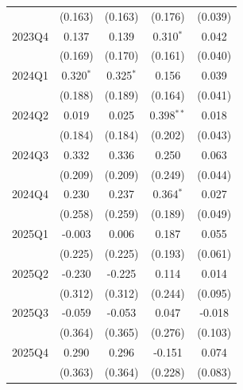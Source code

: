 \begin{table}[htbp]
\begin{tabular}{lcccc}
 & (0.163) & (0.163) & (0.176) & (0.039) \\
2023Q4 & 0.137 & 0.139 & 0.310$^{*}$ & 0.042 \\
 & (0.169) & (0.170) & (0.161) & (0.040) \\
2024Q1 & 0.320$^{*}$ & 0.325$^{*}$ & 0.156 & 0.039 \\
 & (0.188) & (0.189) & (0.164) & (0.041) \\
2024Q2 & 0.019 & 0.025 & 0.398$^{**}$ & 0.018 \\
 & (0.184) & (0.184) & (0.202) & (0.043) \\
2024Q3 & 0.332 & 0.336 & 0.250 & 0.063 \\
 & (0.209) & (0.209) & (0.249) & (0.044) \\
2024Q4 & 0.230 & 0.237 & 0.364$^{*}$ & 0.027 \\
 & (0.258) & (0.259) & (0.189) & (0.049) \\
2025Q1 & -0.003 & 0.006 & 0.187 & 0.055 \\
 & (0.225) & (0.225) & (0.193) & (0.061) \\
2025Q2 & -0.230 & -0.225 & 0.114 & 0.014 \\
 & (0.312) & (0.312) & (0.244) & (0.095) \\
2025Q3 & -0.059 & -0.053 & 0.047 & -0.018 \\
 & (0.364) & (0.365) & (0.276) & (0.103) \\
2025Q4 & 0.290 & 0.296 & -0.151 & 0.074 \\
 & (0.363) & (0.364) & (0.228) & (0.083) \\
\bottomrule
\end{tabular}
\par\vspace{2pt}{\footnotesize Reference quarter 2022Q3 omitted. Standard errors clustered on occupation in parentheses. * p<0.10, ** p<0.05, *** p<0.01.}
\end{table}

